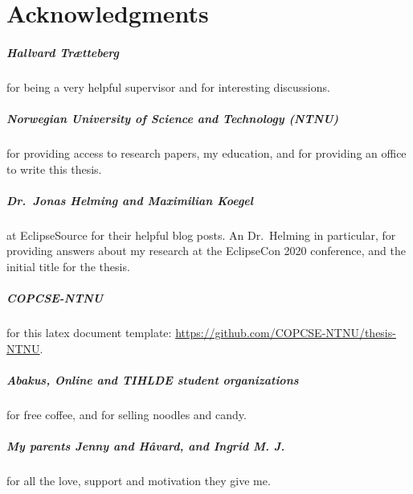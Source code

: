 \cleardoublepage{} %
\chapter*{Acknowledgments}

\paragraph*{Hallvard Trætteberg} for being a very helpful supervisor
and for interesting discussions.

\paragraph*{Norwegian University of Science and Technology (NTNU)} for providing access to research papers, my education, and for providing an office to write this thesis. 

\paragraph*{Dr.\ Jonas Helming and Maximilian Koegel} at EclipseSource for their helpful blog posts. An Dr.\ Helming in particular, for providing answers about my research at the EclipseCon 2020 conference, and the initial title for the thesis.

\paragraph*{COPCSE-NTNU} for this latex document template: \href{https://github.com/COPCSE-NTNU/thesis-NTNU}{https://github.com/COPCSE-NTNU/thesis-NTNU}.

\paragraph{Abakus, Online and TIHLDE student organizations} for free coffee, and for selling noodles and candy.

\paragraph{My parents Jenny and Håvard, and Ingrid M. J.} for all the love, support and motivation they give me.



